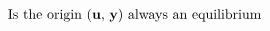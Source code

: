 \documentclass[preview]{standalone}
\begin{document}
\begin{align*}
\text{Is the origin (\textbf{u}, \textbf{y}) always an equilibrium}
\end{align*}
\end{document}
